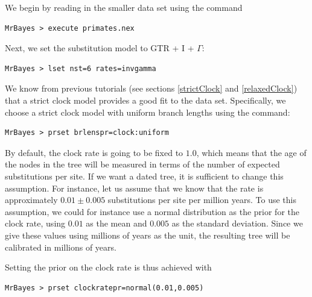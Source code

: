 \documentclass[12pt]{book}
\begin{document}
We begin by reading in the smaller data set using the command

\small
\begin{singlespacing}
\begin{verbatim}
MrBayes > execute primates.nex
\end{verbatim}
\end{singlespacing}
\normalsize

Next, we set the substitution model to GTR + I + $\Gamma$:

\small
\begin{singlespacing}
\begin{verbatim}
MrBayes > lset nst=6 rates=invgamma
\end{verbatim}
\end{singlespacing}
\normalsize

We know from previous tutorials (see sections \ref{strictClock} and \ref{relaxedClock}) that a
strict clock model provides a good fit to the data set. Specifically, we choose a strict clock
model with uniform branch lengths using the command:

\small
\begin{singlespacing}
\begin{verbatim}
MrBayes > prset brlenspr=clock:uniform
\end{verbatim}
\end{singlespacing}
\normalsize

By default, the clock rate is going to be fixed to $1.0$, which means that the age of the nodes in
the tree will be measured in terms of the number of expected substitutions per site. If we want a
dated tree, it is sufficient to change this assumption. For instance, let us assume that we know
that the rate is approximately $0.01 \pm 0.005$ substitutions per site per million years. To use
this assumption, we could for instance use a normal distribution as the prior for the clock rate,
using $0.01$ as the mean and $0.005$ as the standard deviation. Since we give these values using
millions of years as the unit, the resulting tree will be calibrated in millions of years.

Setting the prior on the clock rate is thus achieved with

\small
\begin{singlespacing}
\begin{verbatim}
MrBayes > prset clockratepr=normal(0.01,0.005)
\end{verbatim}
\end{singlespacing}
\normalsize
\end{document}

